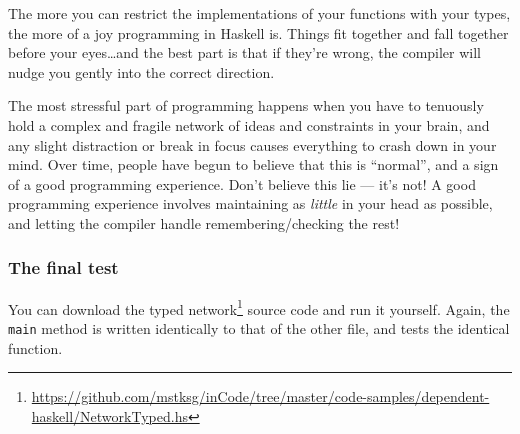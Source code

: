 \documentclass[]{article}
\newenvironment{Shaded}{}{}
\newcommand{\KeywordTok}[1]{\textcolor[rgb]{0.00,0.44,0.13}{\textbf{{#1}}}}
\newcommand{\CommentTok}[1]{\textcolor[rgb]{0.38,0.63,0.69}{\textit{{#1}}}}
\newcommand{\NormalTok}[1]{{#1}}
\renewcommand{\href}[2]{#2\footnote{\url{#1}}}
\begin{document}
The more you can restrict the implementations of your functions with
your types, the more of a joy programming in Haskell is. Things fit
together and fall together before your eyes\ldots{}and the best part is
that if they're wrong, the compiler will nudge you gently into the
correct direction.

The most stressful part of programming happens when you have to
tenuously hold a complex and fragile network of ideas and constraints in
your brain, and any slight distraction or break in focus causes
everything to crash down in your mind. Over time, people have begun to
believe that this is ``normal'', and a sign of a good programming
experience. Don't believe this lie --- it's not! A good programming
experience involves maintaining as \emph{little} in your head as
possible, and letting the compiler handle remembering/checking the rest!

\subsubsection{The final test}\label{the-final-test}

You can download the
\href{https://github.com/mstksg/inCode/tree/master/code-samples/dependent-haskell/NetworkTyped.hs}{typed
network} source code and run it yourself. Again, the \texttt{main}
method is written identically to that of the other file, and tests the
identical function.

\begin{Shaded}
\end{Shaded}
\end{document}
